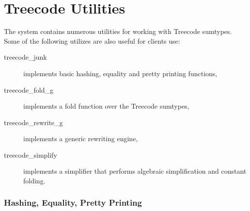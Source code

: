 \section{Treecode Utilities} 

The \LOWHALF{} system contains numerous utilities for working with
Treecode sumtypes.  Some of the following utilizes are also useful for clients
use:
\begin{description}
  \item[treecode_junk] implements basic hashing, equality and pretty
printing functions,
  \item[treecode_fold_g] implements a fold function over the Treecode sumtypes,  
  \item[treecode_rewrite_g] implements a generic rewriting engine,
  \item[treecode_simplify] implements a simplifier that performs algebraic
simplification and constant folding.
\end{description}
\subsubsection{Hashing, Equality, Pretty Printing}

